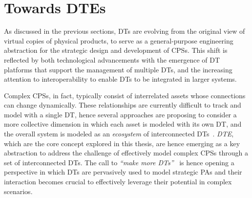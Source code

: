 
\section{Towards \aclp{DTE}}
\label{sec:back:dt:dte}

As discussed in the previous sections, \acp{DT} are evolving from the original view of virtual copies of physical products, to serve as a general-purpose engineering abstraction for the strategic design and development of \acp{CPS}.
%
This shift is reflected by both technological advancements with the emergence of \ac{DT} platforms that support the management of multiple \acp{DT}, and the increasing attention to interoperability to enable \acp{DT} to be integrated in larger systems.


Complex \acp{CPS}, in fact, typically consist of interrelated assets whose connections can change dynamically.
%
These relationships are currently difficult to track and model with a single \ac{DT}, hence several approaches are proposing to consider a more collective dimension in which each asset is modeled with its own \ac{DT}, and the overall system is modeled as an \emph{ecosystem} of interconnected \acp{DT}~\cite{web-of-dt-ricci-2022}.
%
\emph{\ac{DTE}}, which are the core concept explored in this thesis, are hence emerging as a key abstraction to address the challenge of effectively model complex \acp{CPS} through a set of interconnected \acp{DT}.
%
The call to \emph{``make more \aclp{DT}''}~\cite{nature_make_moredt} is hence opening a perspective in which \acp{DT} are pervasively used to model strategic \acp{PA} and their interaction becomes crucial to effectively leverage their potential in complex scenarios.

